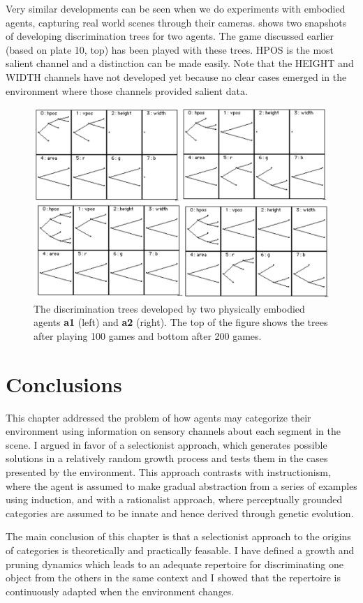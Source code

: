 Very similar developments can be seen when we do 
experiments with embodied agents, capturing real world scenes
through their cameras.  
shows two snapshots of developing discrimination trees
for two agents. The game discussed earlier (based on 
plate 10, top) has been played with these trees. 
HPOS is the most salient channel and a distinction can 
be made easily. Note that the HEIGHT and WIDTH channels have not 
developed yet because no clear cases emerged 
in the environment where those channels provided 
salient data. 
\begin{figure}[htbp]
  \centerline{\includegraphics[width=.65\textwidth]{chap4/figs/discri200}}
\caption{\label{discri200a} The discrimination trees 
developed by two physically embodied agents 
{\bf a1} (left) and {\bf a2} (right). The top of the 
figure shows the trees after 
playing 100 games and bottom after 200 games.}
\end{figure}

\section{Conclusions}

This chapter addressed the problem of how agents may 
categorize their environment using information 
on sensory channels about each segment in the scene. 
I argued in favor of a selectionist approach, which 
generates possible solutions in a relatively 
random growth process and tests them in the 
cases presented by the environment. 
This approach contrasts with instructionism, where
the agent is assumed to make gradual abstraction 
from a series of examples using induction, and with 
a rationalist approach, where perceptually grounded categories are
assumed to be innate and hence derived through 
genetic evolution. 

The main conclusion of this chapter is that a selectionist
approach to the origins of categories
is theoretically and practically feasable. I have 
defined a growth and pruning dynamics which leads to 
an adequate repertoire for 
discriminating one object from the others in the 
same context and I showed that the repertoire is
continuously adapted when the environment changes. 

